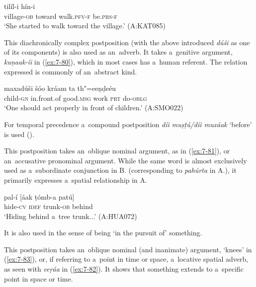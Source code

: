 \begin{exe}
\ex
\label{ex:7-79}
 tilíl-i hín-i \\
village-\textsc{ob} toward walk.\textsc{pfv-f} be.\textsc{prs-f} \\
\glt `She started to walk toward the village.' (A:KAT085)
\end{exe}

 This diachronically complex postposition (with the above introduced \textit{dúši} as one of its components) is also used as an~adverb. It takes a~genitive argument, \textit{kuṇaak-íi} in (\ref{ex:7-80}), which in most cases has a~human referent. The relation expressed is commonly of an~abstract kind.

\begin{exe}
\ex
\label{ex:7-80}
\gll [kuṇaak-íi] maxadúši šóo kráam ta th"=eeṇḍeéu \\
child-\textsc{gn}  in.front.of good.\textsc{msg} work \textsc{prt} do-\textsc{oblg} \\
\glt `One should act properly in front of children.' (A:SMO022)
\end{exe}

For temporal precedence a~compound postposition \textit{díi muṣṭú/díi muxáak} `before' is used ().


 This postposition takes an~oblique nominal argument, as in (\ref{ex:7-81}), or an~accusative pronominal argument. While the same word is almost exclusively used as a~subordinate conjunction in B. (corresponding to \textit{pahúrta} in A.), it primarily expresses a~spatial relationship in A. 

\begin{exe}
\ex
\label{ex:7-81}
\gll pal-í [áak ṭómb-a patú] \\
hide-\textsc{cv} \textsc{idef} trunk-\textsc{ob} behind \\
\glt `Hiding behind a~tree trunk...' (A:HUA072)
\end{exe}

It is also used in the sense of being `in the pursuit of' something.


 This postposition takes an~oblique nominal (and inanimate) argument, `knees' in (\ref{ex:7-83}), or, if referring to a~point in time or space, a~locative spatial adverb, as seen with \textit{eeṛáa} in (\ref{ex:7-82}). It shows that something extends to a~specific point in space or time. 

